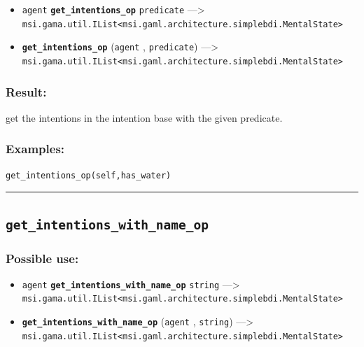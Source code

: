 \documentclass[]{book}
\providecommand{\tightlist}{%
  \setlength{\itemsep}{0pt}\setlength{\parskip}{0pt}}
\theoremstyle{definition}
\theoremstyle{definition}
\theoremstyle{definition}
\theoremstyle{remark}
\begin{document}
\begin{itemize}
\tightlist
\item
  \texttt{agent} \textbf{\texttt{get\_intentions\_op}}
  \texttt{predicate} ---\textgreater{}
  \texttt{msi.gama.util.IList\textless{}msi.gaml.architecture.simplebdi.MentalState\textgreater{}}
\item
  \textbf{\texttt{get\_intentions\_op}} (\texttt{agent} ,
  \texttt{predicate}) ---\textgreater{}
  \texttt{msi.gama.util.IList\textless{}msi.gaml.architecture.simplebdi.MentalState\textgreater{}}
\end{itemize}

\subsubsection{Result:}\label{result-210}

get the intentions in the intention base with the given predicate.

\subsubsection{Examples:}\label{examples-163}

\begin{verbatim}
get_intentions_op(self,has_water) 
\end{verbatim}

\begin{center}\rule{0.5\linewidth}{\linethickness}\end{center}

\subsection{\texorpdfstring{\texttt{get\_intentions\_with\_name\_op}}{get\_intentions\_with\_name\_op}}\label{get_intentions_with_name_op}

\subsubsection{Possible use:}\label{possible-use-217}

\begin{itemize}
\tightlist
\item
  \texttt{agent} \textbf{\texttt{get\_intentions\_with\_name\_op}}
  \texttt{string} ---\textgreater{}
  \texttt{msi.gama.util.IList\textless{}msi.gaml.architecture.simplebdi.MentalState\textgreater{}}
\item
  \textbf{\texttt{get\_intentions\_with\_name\_op}} (\texttt{agent} ,
  \texttt{string}) ---\textgreater{}
  \texttt{msi.gama.util.IList\textless{}msi.gaml.architecture.simplebdi.MentalState\textgreater{}}
\end{itemize}
\end{document}
